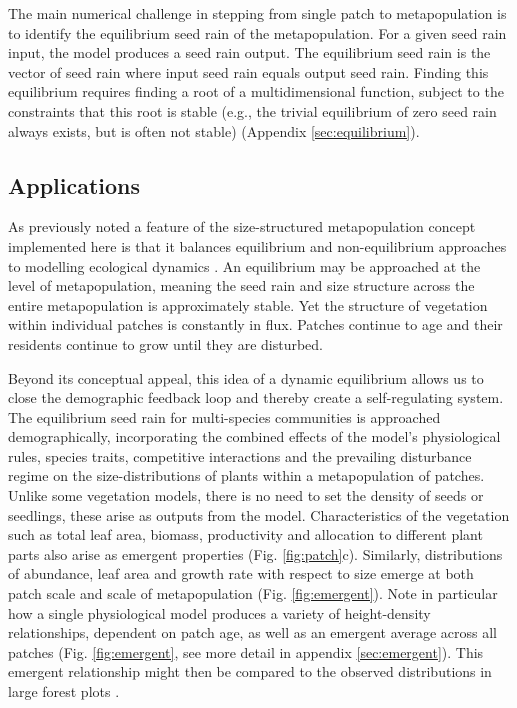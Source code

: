 \documentclass[a4paper,11pt]{article}
\begin{document}
The main numerical challenge in stepping from single patch to
metapopulation is to identify the equilibrium seed rain of the
metapopulation. For a given seed rain input, the model produces a seed
rain output.
The equilibrium seed rain is the vector of seed rain where input seed
rain equals output seed rain. Finding this equilibrium requires
finding a root of a multidimensional function, subject to the
constraints that this root is stable (e.g., the trivial equilibrium of
zero seed rain always exists, but is often not stable) (Appendix
\ref{sec:equilibrium}).

\subsection{Applications}


As previously noted \citep{Kohyama-1993, Moorcroft-2001, Falster-2011} a
feature of the size-structured metapopulation concept implemented here
is that it balances equilibrium and non-equilibrium approaches to
modelling ecological dynamics
\citep{Levin-1974, Bormann-1979, Connell-1978, Coomes-2007}. An
equilibrium may be approached at the level of metapopulation, meaning
the seed rain and size structure across the entire metapopulation is
approximately stable. Yet the structure of vegetation within individual
patches is constantly in flux. Patches continue to age and their
residents continue to grow until they are disturbed.

Beyond its conceptual appeal, this idea of a dynamic equilibrium
allows us to close the demographic feedback loop and thereby create a
self-regulating system. The equilibrium seed rain for multi-species
communities is approached demographically, incorporating the combined
effects of the model's physiological rules, species traits,
competitive interactions and the prevailing disturbance regime on the
size-distributions of plants within a metapopulation of
patches. Unlike some vegetation models, there is no need to set the
density of seeds or seedlings, these arise as outputs from the
model. Characteristics of the vegetation such as total leaf area,
biomass, productivity and allocation to different plant parts also
arise as emergent properties (Fig.  \ref{fig:patch}c). Similarly,
distributions of abundance, leaf area and growth rate with respect to
size emerge at both patch scale and scale of metapopulation
(Fig. \ref{fig:emergent}). Note in particular how a single
physiological model produces a variety of height-density
relationships, dependent on patch age, as well as an emergent average
across all patches (Fig. \ref{fig:emergent}, see more detail in
appendix \ref{sec:emergent}). This emergent relationship might then be
compared to the observed distributions in large forest plots
\citep{Muller-2006}.
\end{document}
